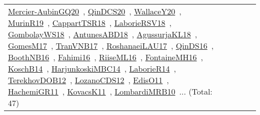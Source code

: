 {\begin{longtable}{lp{3cm}>{\raggedright\arraybackslash}p{6cm}>{\raggedright\arraybackslash}p{6cm}>{\raggedright\arraybackslash}p{8cm}}
\href{../works/Mercier-AubinGQ20.pdf}{Mercier-AubinGQ20}~\cite{Mercier-AubinGQ20}, \href{../works/QinDCS20.pdf}{QinDCS20}~\cite{QinDCS20}, \href{../works/WallaceY20.pdf}{WallaceY20}~\cite{WallaceY20}, \href{../works/MurinR19.pdf}{MurinR19}~\cite{MurinR19}, \href{../works/CappartTSR18.pdf}{CappartTSR18}~\cite{CappartTSR18}, \href{../works/LaborieRSV18.pdf}{LaborieRSV18}~\cite{LaborieRSV18}, \href{../works/GombolayWS18.pdf}{GombolayWS18}~\cite{GombolayWS18}, \href{../works/AntunesABD18.pdf}{AntunesABD18}~\cite{AntunesABD18}, \href{../works/AgussurjaKL18.pdf}{AgussurjaKL18}~\cite{AgussurjaKL18}, \href{../works/GomesM17.pdf}{GomesM17}~\cite{GomesM17}, \href{../works/TranVNB17.pdf}{TranVNB17}~\cite{TranVNB17}, \href{../works/RoshanaeiLAU17.pdf}{RoshanaeiLAU17}~\cite{RoshanaeiLAU17}, \href{../works/QinDS16.pdf}{QinDS16}~\cite{QinDS16}, \href{../works/BoothNB16.pdf}{BoothNB16}~\cite{BoothNB16}, \href{../works/Fahimi16.pdf}{Fahimi16}~\cite{Fahimi16}, \href{../works/RiiseML16.pdf}{RiiseML16}~\cite{RiiseML16}, \href{../works/FontaineMH16.pdf}{FontaineMH16}~\cite{FontaineMH16}, \href{../works/KoschB14.pdf}{KoschB14}~\cite{KoschB14}, \href{../works/HarjunkoskiMBC14.pdf}{HarjunkoskiMBC14}~\cite{HarjunkoskiMBC14}, \href{../works/LaborieR14.pdf}{LaborieR14}~\cite{LaborieR14}, \href{../works/TerekhovDOB12.pdf}{TerekhovDOB12}~\cite{TerekhovDOB12}, \href{../works/LozanoCDS12.pdf}{LozanoCDS12}~\cite{LozanoCDS12}, \href{../works/EdisO11.pdf}{EdisO11}~\cite{EdisO11}, \href{../works/HachemiGR11.pdf}{HachemiGR11}~\cite{HachemiGR11}, \href{../works/KovacsK11.pdf}{KovacsK11}~\cite{KovacsK11}, \href{../works/LombardiMRB10.pdf}{LombardiMRB10}~\cite{LombardiMRB10}... (Total: 47)\\

\end{longtable}}
